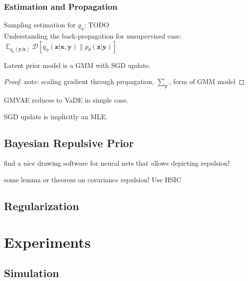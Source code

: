 \documentclass[twoside,11pt]{article}
\DeclareMathOperator{\E}{\mathbb{E}}
\begin{document}
\subsubsection{Estimation and Propagation}

Sampling estimation for $q_\phi$: TODO \\

Understanding the back-propagation for unsupervised case:
$\E_{q_\phi (\bm{y} | \bm{x})} 
    \mathcal{D} \left[ q_\phi (\bm{z} | \bm{x}, 
    \bm{y}) \parallel p_\theta (\bm{z} | \bm{y}) 
    \right]$

\begin{lemma}
Latent prior model is a GMM with SGD update.
\end{lemma}

\begin{proof}
note: scaling gradient through propagation, $\sum_{\bm{y}}$, form of GMM model
\end{proof}

\begin{lemma}
GMVAE reduces to VaDE in simple case.
\end{lemma}

\begin{lemma}
SGD update is implicitly an MLE.
\end{lemma}

\subsection{Bayesian Repulsive Prior}

find a nice drawing software for neural nets that allows depicting repulsion!

\begin{lemma}
some lemma or theorem on covariance repulsion! Use HSIC
\end{lemma}

\subsection{Regularization}

\section{Experiments}



\subsection{Simulation}
\label{subsec:sim}
\end{document}
